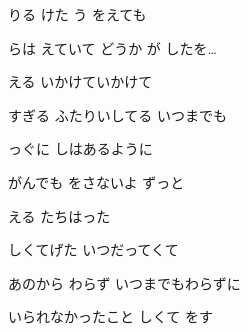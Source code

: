 \documentclass[14pt]{ltjsarticle}
\begin{document}
{\item
  りる けた う  をえても
  \jisho{}

  らは えていて どうか が したを…
  \jisho{}

\item
  える いかけていかけて
  \jisho{}

  すぎる ふたりいしてる いつまでも
  \jisho{}

  っぐに しはあるように
  \jisho{}

  がんでも をさないよ ずっと
  \jisho{}

\item
  える たちはった
  \jisho{}

  しくてげた いつだってくて
  \jisho{}

  
あのから わらず いつまでもわらずに
  \jisho{}

  
いられなかったこと しくて をす        
}
\end{document}
